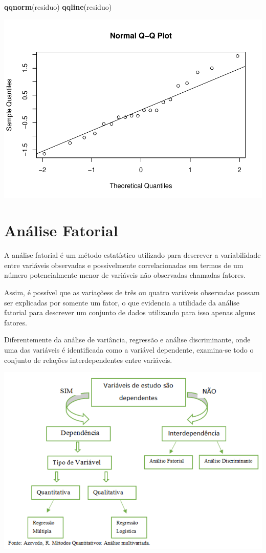 \documentclass[12pt,brazil,]{book}
\newenvironment{Shaded}{\begin{snugshade}}{\end{snugshade}}
\newcommand{\KeywordTok}[1]{\textcolor[rgb]{0.13,0.29,0.53}{\textbf{#1}}}
\newcommand{\NormalTok}[1]{#1}
\begin{document}
\begin{Shaded}
\begin{Highlighting}[]
\KeywordTok{qqnorm}\NormalTok{(residuo)}
\KeywordTok{qqline}\NormalTok{(residuo)}
\end{Highlighting}
\end{Shaded}

\includegraphics{02-Delinexp_files/figure-latex/unnamed-chunk-15-1.pdf}

\hypertarget{analise-fatorial}{%
\chapter{Análise Fatorial}\label{analise-fatorial}}

A análise fatorial é um método estatístico utilizado para descrever a
variabilidade entre variáveis observadas e possivelmente correlacionadas
em termos de um número potencialmente menor de variáveis não observadas
chamadas fatores.

Assim, é possível que as variaçõess de três ou quatro variáveis
observadas possam ser explicadas por somente um fator, o que evidencia a
utilidade da análise fatorial para descrever um conjunto de dados
utilizando para isso apenas alguns fatores.

Diferentemente da análise de variância, regressão e análise
discriminante, onde uma das variáveis é identificada como a variável
dependente, examina-se todo o conjunto de relações interdependentes
entre variáveis.

\includegraphics{anfat1.png}
\end{document}
